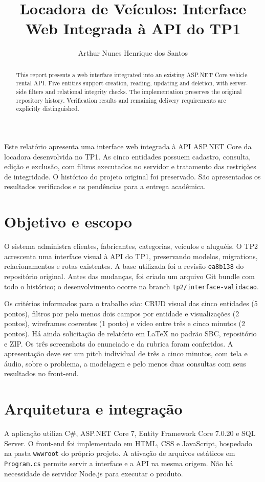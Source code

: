 \documentclass[12pt]{article}
\title{Locadora de Veículos: Interface Web Integrada à API do TP1}
\author{Arthur Nunes Henrique dos Santos\inst{1}}
\begin{document}
\maketitle
\begin{abstract}
This report presents a web interface integrated into an existing ASP.NET Core vehicle rental API. Five entities support creation, reading, updating and deletion, with server-side filters and relational integrity checks. The implementation preserves the original repository history. Verification results and remaining delivery requirements are explicitly distinguished.
\end{abstract}
\begin{resumo}
Este relatório apresenta uma interface web integrada à API ASP.NET Core da locadora desenvolvida no TP1. As cinco entidades possuem cadastro, consulta, edição e exclusão, com filtros executados no servidor e tratamento das restrições de integridade. O histórico do projeto original foi preservado. São apresentados os resultados verificados e as pendências para a entrega acadêmica.
\end{resumo}
\section{Objetivo e escopo}
O sistema administra clientes, fabricantes, categorias, veículos e aluguéis. O TP2 acrescenta uma interface visual à API do TP1, preservando modelos, migrations, relacionamentos e rotas existentes. A base utilizada foi a revisão \texttt{ea8b138} do repositório original. Antes das mudanças, foi criado um arquivo Git bundle com todo o histórico; o desenvolvimento ocorre na branch \texttt{tp2/interface-validacao}.

Os critérios informados para o trabalho são: CRUD visual das cinco entidades (5 pontos), filtros por pelo menos dois campos por entidade e visualizações (2 pontos), wireframes coerentes (1 ponto) e vídeo entre três e cinco minutos (2 pontos). Há ainda solicitação de relatório em LaTeX no padrão SBC, repositório e ZIP. Os três screenshots do enunciado e da rubrica foram conferidos. A apresentação deve ser um pitch individual de três a cinco minutos, com tela e áudio, sobre o problema, a modelagem e pelo menos duas consultas com seus resultados no front-end.
\section{Arquitetura e integração}
A aplicação utiliza C\#, ASP.NET Core 7, Entity Framework Core 7.0.20 e SQL Server. O front-end foi implementado em HTML, CSS e JavaScript, hospedado na pasta \texttt{wwwroot} do próprio projeto. A ativação de arquivos estáticos em \texttt{Program.cs} permite servir a interface e a API na mesma origem. Não há necessidade de servidor Node.js para executar o produto.
\end{document}
